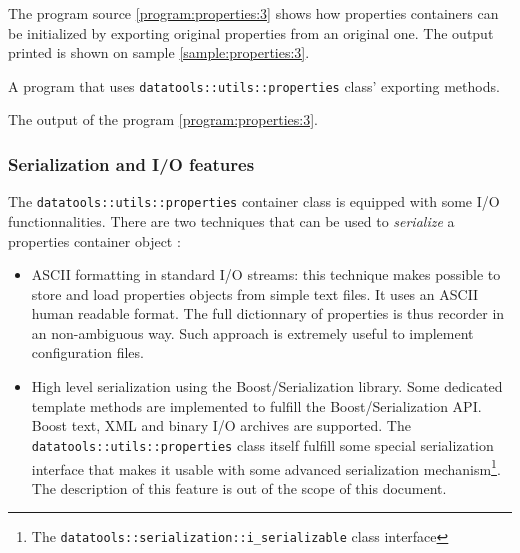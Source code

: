 The program source  \ref{program:properties:3} shows how properties
containers can be initialized by exporting original properties from
an  original   one.   The  output   printed  is  shown   on  sample
\ref{sample:properties:3}.


\begin{program}[h]
\caption{A  program  that  uses  \texttt{datatools::utils::properties}
  class' exporting methods.}
\label{program:properties:3}
\end{program}

\begin{sample}[h]
\caption{The output of the program \ref{program:properties:3}.}
\label{sample:properties:3}
\end{sample}


\subsubsection{Serialization and I/O features}

The \texttt{datatools::utils::properties}  container class is equipped
with some I/O  functionnalities. There are two techniques  that can be
used to \emph{serialize} a properties container object :

\begin{itemize}

\item ASCII  formatting in standard I/O streams:  this technique makes
  possible  to store  and  load properties  objects  from simple  text
  files.  It uses an ASCII human readable format. The full dictionnary
  of  properties  is  thus  recorder  in an  non-ambiguous  way.  Such
  approach is extremely useful to implement configuration files.

\item High level  serialization using the Boost/Serialization library.
  Some  dedicated  template methods  are  implemented  to fulfill  the
  Boost/Serialization API. Boost text, XML and binary I/O archives are
  supported.  The  \texttt{datatools::utils::properties} class  itself
  fulfill some  special serialization  interface that makes  it usable
  with    some     advanced    serialization    mechanism\footnote{The
    \texttt{datatools::serialization::i\_serializable}            class
    interface}.  The description  of this feature is out  of the scope
  of this document.

\end{itemize} 

